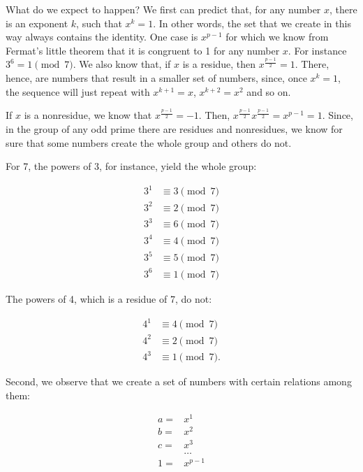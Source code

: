 \documentclass{scrreprt}
\begin{document}
What do we expect to happen?
We first can predict that,
for any number $x$, there is an exponent
$k$, such that $x^k = 1$.
In other words, the set that we create
in this way always contains the identity.
One case is $x^{p-1}$ for which we know
from Fermat's little theorem 
that it is congruent to 1 for any number $x$.
For instance $3^6 = 1 \pmod{7}$.
We also know that, if $x$ is a residue,
then $x^{\frac{p-1}{2}} = 1$.
There, hence, are numbers that result
in a smaller set of numbers, since,
once $x^k = 1$, the sequence
will just repeat with $x^{k+1} = x$,
$x^{k+2} = x^2$
and so on.

If $x$ is a nonresidue,
we know that $x^{\frac{p-1}{2}} = -1$.
Then, $x^{\frac{p-1}{2}}x^{\frac{p-1}{2}} = x^{p-1} = 1$.
Since, in the group of any odd prime
there are residues and nonresidues,
we know for sure that some numbers
create the whole group and others do not.

For 7, the powers of 3, for instance,
yield the whole group:

\begin{align*}
3^1 & \equiv 3 \pmod{7}\\
3^2 & \equiv 2 \pmod{7}\\
3^3 & \equiv 6 \pmod{7}\\
3^4 & \equiv 4 \pmod{7}\\
3^5 & \equiv 5 \pmod{7}\\
3^6 & \equiv 1 \pmod{7}
\end{align*}

The powers of 4, which is a residue of 7, do not:

\begin{align*}
4^1 & \equiv 4 \pmod{7}\\
4^2 & \equiv 2 \pmod{7}\\
4^3 & \equiv 1 \pmod{7}.
\end{align*}

Second, we observe that we
create a set of numbers
with certain relations among them:

\begin{align*}
a = & x^1\\
b = & x^2\\
c = & x^3\\
    & \dots\\
1 = & x^{p-1}
\end{align*}
\end{document}
